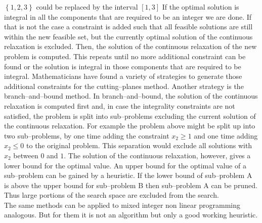  $\left\lbrace 1,2,3 \right\rbrace $
  could be replaced by the interval 
  $\left[ 1,3 \right] $
If the optimal solution is integral in all the components that are required to be an integer we are done. If that is not the case a constraint is added such that all feasible solutions are still within the new feasible set, but the currently optimal solution of the continuous relaxation is excluded. Then, the solution of the continuous relaxation of the new problem is computed. This repeats until no more additional constraint can be found or the solution is integral in those components that are required to be integral. Mathematicians have found a variety of strategies to generate those additional constraints for the cutting--planes method. Another strategy is the branch--and--bound method. In branch--and--bound, the solution of the continuous relaxation is computed first and, in case the integrality constraints are not satisfied, the problem is split into sub--problems excluding the current solution of the continuous relaxation. For example the problem above might be split up into two sub--problems, by one time adding the constraint $x_2\geq 1$ and one time adding $x_2\leq 0$ to the original problem. This separation would exclude all solutions with $x_2$ between $0$ and $1$. The solution of the continuous relaxation, however, gives a lower bound for the optimal value. An upper bound for the optimal value of a sub--problem can be gained by a heuristic. If the lower bound of sub--problem \textsf{A} is above the upper bound for sub--problem \textsf{B} then sub--problem \textsf{A} can be pruned. Thus large portions of the search space are excluded from the search.\\
The same methods can be applied to mixed integer non linear programming analogous. But for them it is not an algorithm but only a good working heuristic.
